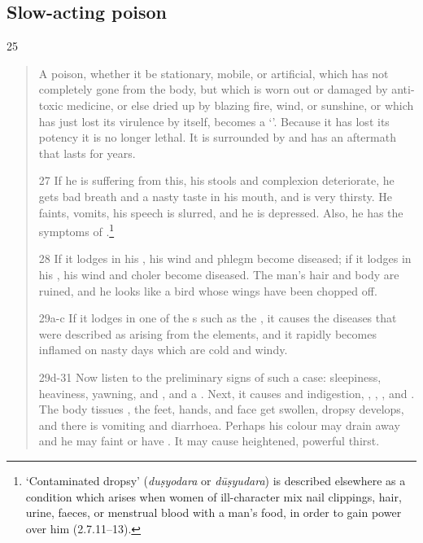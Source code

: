 \begin{translation}
    \subsection{Slow-acting poison}
    \item[25]  
    \begin{verse}
        A poison, whether it be stationary, mobile, or artificial, which has not
        completely gone from the body, but which is worn out or damaged by
        anti-toxic medicine, or else dried up by blazing fire, wind, or sunshine, or
        which has just lost its virulence by itself, becomes a `'\label{dusivisa}.  Because it has lost its potency it is
        no longer lethal.  It is surrounded by  and has an
        aftermath that lasts for years.
        
        \item[27]
        If he is suffering from this, his stools and complexion deteriorate, he gets
        bad breath and a nasty taste in his mouth, and is very thirsty.  He
        faints, vomits, his speech is slurred, and he is depressed.  Also, he has
        the symptoms of .\footnote{\label{dusyodara}`Contaminated dropsy'
        (\emph{duṣyodara} or \emph{dūṣyudara}) is described elsewhere as a
        condition which arises when women of ill-character mix nail clippings,
        hair, urine, faeces, or menstrual blood with a man's food, in order to
        gain power over him (2.7.11--13).}
        \item[28]
        If it lodges in his , his wind and phlegm become
        diseased; if it lodges in his , his wind and choler
        become diseased.  The man's hair and body are ruined, and he looks like a
        bird whose wings have been chopped off.
        \item[29a-c]
        If it lodges in one of the s such as the
        , it causes the diseases that were described as arising
        from the elements, and it rapidly becomes inflamed on nasty days which are
        cold and windy.
        
        \item[29d-31]
        Now listen to the preliminary signs of such a case: sleepiness, heaviness,
        yawning,  and , and a
        . Next, it causes
         and indigestion, ,
        , , and
        . The body tissues ,
        the feet, hands, and face get swollen, dropsy develops, and there is
        vomiting and diarrhoea. Perhaps his colour may drain away and he may faint
        or have .  It may cause heightened,
        powerful thirst.
        

\end{verse}
\end{translation}
